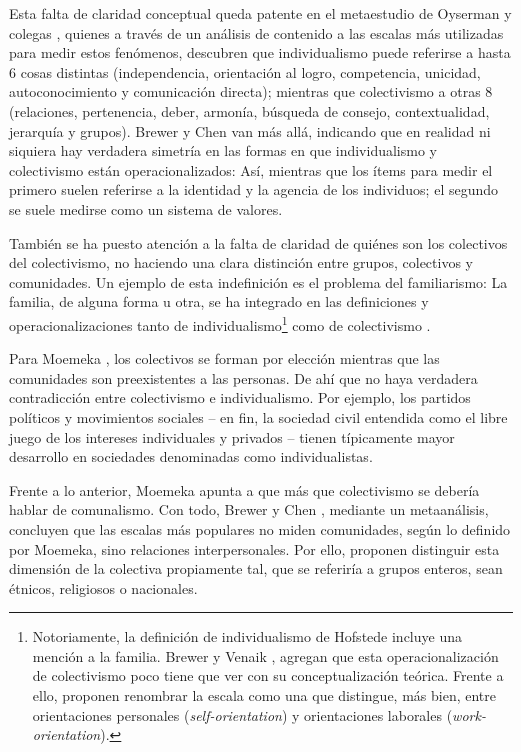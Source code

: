 \documentclass[12pt,twoside]{templates/facsothesis}
\begin{document}
Esta falta de claridad conceptual queda patente en el metaestudio de Oyserman y colegas \citeyearpar{oyserman2002}, quienes a través de un análisis de contenido a las escalas más utilizadas para medir estos fenómenos, descubren que individualismo puede referirse a hasta 6 cosas distintas (independencia, orientación al logro, competencia, unicidad, autoconocimiento y comunicación directa); mientras que colectivismo a otras 8 (relaciones, pertenencia, deber, armonía, búsqueda de consejo, contextualidad, jerarquía y grupos). Brewer y Chen \citeyearpar{brewer2007} van más allá, indicando que en realidad ni siquiera hay verdadera simetría en las formas en que individualismo y colectivismo están operacionalizados: Así, mientras que los ítems para medir el primero suelen referirse a la identidad y la agencia de los individuos; el segundo se suele medirse como un sistema de valores.

También se ha puesto atención a la falta de claridad de quiénes son los colectivos del colectivismo, no haciendo una clara distinción entre grupos, colectivos y comunidades. Un ejemplo de esta indefinición es el problema del familiarismo: La familia, de alguna forma u otra, se ha integrado en las definiciones y operacionalizaciones tanto de individualismo\footnote{Notoriamente, la definición de individualismo de Hofstede incluye una mención a la familia. Brewer y Venaik \citeyearpar{brewer2011}, agregan que esta operacionalización de colectivismo poco tiene que ver con su conceptualización teórica. Frente a ello, proponen renombrar la escala como una que distingue, más bien, entre orientaciones personales (\emph{self-orientation}) y orientaciones laborales (\emph{work-orientation}).} como de colectivismo \citep{oyserman2002}.

Para Moemeka \citeyearpar{moemeka1998}, los colectivos se forman por elección mientras que las comunidades son preexistentes a las personas. De ahí que no haya verdadera contradicción entre colectivismo e individualismo. Por ejemplo, los partidos políticos y movimientos sociales -- en fin, la sociedad civil entendida como el libre juego de los intereses individuales y privados \citep{arribas1999} -- tienen típicamente mayor desarrollo en sociedades denominadas como individualistas.

Frente a lo anterior, Moemeka \citeyearpar{moemeka1998} apunta a que más que colectivismo se debería hablar de comunalismo. Con todo, Brewer y Chen \citeyearpar{brewer2007}, mediante un metaanálisis, concluyen que las escalas más populares no miden comunidades, según lo definido por Moemeka, sino relaciones interpersonales. Por ello, proponen distinguir esta dimensión de la colectiva propiamente tal, que se referiría a grupos enteros, sean étnicos, religiosos o nacionales.
\end{document}
